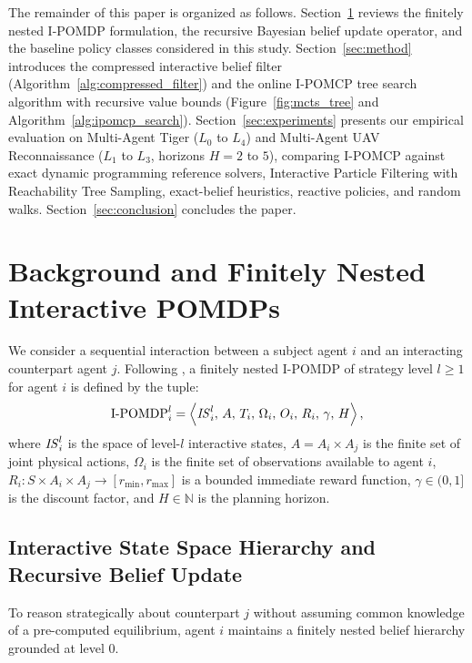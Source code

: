 The remainder of this paper is organized as follows. Section~\ref{sec:background} reviews the finitely nested I-POMDP formulation, the recursive Bayesian belief update operator, and the baseline policy classes considered in this study. Section~\ref{sec:method} introduces the compressed interactive belief filter (Algorithm~\ref{alg:compressed_filter}) and the online I-POMCP tree search algorithm with recursive value bounds (Figure~\ref{fig:mcts_tree} and Algorithm~\ref{alg:ipomcp_search}). Section~\ref{sec:experiments} presents our empirical evaluation on Multi-Agent Tiger ($L_0$ to $L_4$) and Multi-Agent UAV Reconnaissance ($L_1$ to $L_3$, horizons $H=2$ to $5$), comparing I-POMCP against exact dynamic programming reference solvers, Interactive Particle Filtering with Reachability Tree Sampling, exact-belief heuristics, reactive policies, and random walks. Section~\ref{sec:conclusion} concludes the paper.

\section{Background and Finitely Nested Interactive POMDPs}
\label{sec:background}

We consider a sequential interaction between a subject agent $i$ and an interacting counterpart agent $j$. Following \citet{gmytrasiewicz2005framework}, a finitely nested I-POMDP of strategy level $l \ge 1$ for agent $i$ is defined by the tuple:
\begin{equation}
  \mathrm{I\text{-}POMDP}_i^l = \left\langle \mathit{IS}_i^l, \, A, \, T_i, \, \Omega_i, \, O_i, \, R_i, \, \gamma, \, H \right\rangle,
  \label{eq:ipomdp_tuple}
\end{equation}
where $\mathit{IS}_i^l$ is the space of level-$l$ interactive states, $A = A_i \times A_j$ is the finite set of joint physical actions, $\Omega_i$ is the finite set of observations available to agent $i$, $R_i: S \times A_i \times A_j \to [r_{\min}, r_{\max}]$ is a bounded immediate reward function, $\gamma \in (0, 1]$ is the discount factor, and $H \in \mathbb{N}$ is the planning horizon.

\subsection{Interactive State Space Hierarchy and Recursive Belief Update}

To reason strategically about counterpart $j$ without assuming common knowledge of a pre-computed equilibrium, agent $i$ maintains a finitely nested belief hierarchy grounded at level $0$.

